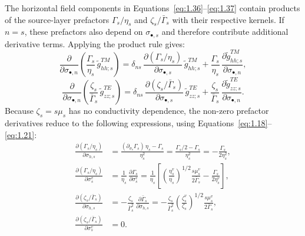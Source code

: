\documentclass[12pt]{report}
\newcommand{\pds}[1]{\partial_{\sigma_{#1}}}   %
\begin{document}
The horizontal field components in
Equations~\eqref{eq:1.36}--\eqref{eq:1.37} contain products of the
source-layer prefactors \(\Gamma_s/\eta_s\) and
\(\zeta_s/\bar\Gamma_s\) with their respective kernels. If \(n=s\),
these prefactors also depend on \(\sigma_{\bullet,s}\) and therefore
contribute additional derivative terms. Applying the product rule gives:
\begin{equation}
    \frac{\partial}{\partial\sigma_{\bullet,n}}\!\left(
        \frac{\Gamma_s}{\eta_s}\,\tilde{g}^{TM}_{hh;s}\right)
    = \delta_{ns}\,\frac{\partial(\Gamma_s/\eta_s)}{\partial\sigma_{\bullet,s}}
      \,\tilde{g}^{TM}_{hh;s}
    + \frac{\Gamma_s}{\eta_s}\,
      \frac{\partial\tilde{g}^{TM}_{hh;s}}{\partial\sigma_{\bullet,n}},
    \label{eq:1.94}
\end{equation}
\begin{equation}
    \frac{\partial}{\partial\sigma_{\bullet,n}}\!\left(
        \frac{\zeta_s}{\bar\Gamma_s}\,\tilde{g}^{TE}_{zz;s}\right)
    = \delta_{ns}\,\frac{\partial(\zeta_s/\bar\Gamma_s)}{\partial\sigma_{\bullet,s}}
      \,\tilde{g}^{TE}_{zz;s}
    + \frac{\zeta_s}{\bar\Gamma_s}\,
      \frac{\partial\tilde{g}^{TE}_{zz;s}}{\partial\sigma_{\bullet,n}}.
    \label{eq:1.95}
\end{equation}
Because \(\zeta_s=s\mu_s\) has no conductivity dependence, the non-zero
prefactor derivatives reduce to the following expressions, using
Equations~\eqref{eq:1.18}--\eqref{eq:1.21}:
\begin{align}
    \frac{\partial(\Gamma_s/\eta_s)}{\partial\sigma_{h,s}}
    &= \frac{(\pds{s}\Gamma_s)\,\eta_s - \Gamma_s}{\eta_s^2}
     = \frac{\Gamma_s/2 - \Gamma_s}{\eta_s^2}
     = -\frac{\Gamma_s}{2\eta_s^2},
    \label{eq:1.96} \\[4pt]
    \frac{\partial(\Gamma_s/\eta_s)}{\partial\sigma^v_s}
    &= \frac{1}{\eta_s}\,\frac{\partial\Gamma_s}{\partial\sigma^v_s}
     = \frac{1}{\eta_s}
       \!\left[\left(\frac{\eta^v_s}{\eta_s}\right)^{\!1/2}
               \frac{s\mu^v_s}{2\bar\Gamma_s}
             - \frac{\Gamma_s}{2\eta^v_s}\right],
    \label{eq:1.97} \\[4pt]
    \frac{\partial(\zeta_s/\bar\Gamma_s)}{\partial\sigma_{h,s}}
    &= -\frac{\zeta_s}{\bar\Gamma_s^2}\,\frac{\partial\bar\Gamma_s}{\partial\sigma_{h,s}}
     = -\frac{\zeta_s}{\bar\Gamma_s^2}
       \left(\frac{\zeta^v_s}{\zeta_s}\right)^{\!1/2}\!\frac{s\mu^v_s}{2\bar\Gamma_s},
    \label{eq:1.98} \\[4pt]
    \frac{\partial(\zeta_s/\bar\Gamma_s)}{\partial\sigma^v_s}
    &= 0.
    \label{eq:1.99}
\end{align}
\end{document}
